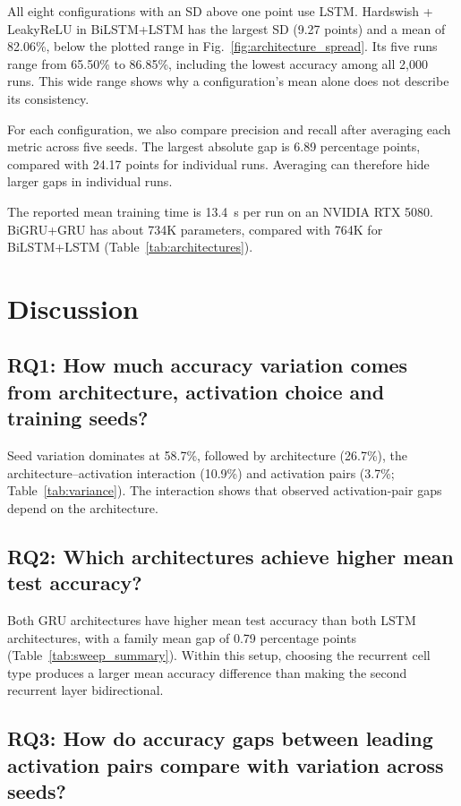 \documentclass[conference,a4paper]{IEEEtran}
\begin{document}
All eight configurations with an SD above one point use
LSTM. Hardswish + LeakyReLU in BiLSTM+LSTM has the largest
SD (9.27 points) and a mean of 82.06\%, below the plotted
range in Fig.~\ref{fig:architecture_spread}. Its five runs
range from 65.50\% to 86.85\%, including the lowest accuracy
among all 2{,}000 runs. This wide range shows why a
configuration's mean alone does not describe its consistency.

For each configuration, we also compare precision and recall
after averaging each metric across five seeds. The largest
absolute gap is 6.89 percentage points, compared with 24.17
points for individual runs. Averaging can therefore hide larger gaps in individual runs.

The reported mean training time is 13.4~s per run on an
NVIDIA RTX 5080. BiGRU+GRU has about 734K parameters,
compared with 764K for BiLSTM+LSTM
(Table~\ref{tab:architectures}).

\FloatBarrier

\section{Discussion}
\label{sec:discussion}

\subsection{RQ1: How much accuracy variation comes from architecture, activation choice and training seeds?}
\label{sec:rq1}

Seed variation dominates at 58.7\%, followed by architecture
(26.7\%), the architecture--activation interaction (10.9\%)
and activation pairs (3.7\%; Table~\ref{tab:variance}).
The interaction shows that observed activation-pair gaps
depend on the architecture.

\subsection{RQ2: Which architectures achieve higher mean test accuracy?}
\label{sec:rq2}

Both GRU architectures have higher mean test accuracy than
both LSTM architectures, with a family mean gap of 0.79
percentage points (Table~\ref{tab:sweep_summary}). Within
this setup, choosing the recurrent cell type produces a
larger mean accuracy difference than making the second
recurrent layer bidirectional.

\subsection{RQ3: How do accuracy gaps between leading activation pairs compare with variation across seeds?}
\label{sec:rq3}
\end{document}

